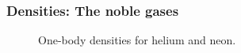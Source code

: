 \begin{frame}
\frametitle{Densities: The noble gases}
 \begin{figure}
 \begin{center}
  \caption{One-body densities for helium and neon. }
  \label{fig:OBD_noble_Atoms_2D_combo}
 \end{center}
\end{figure}
\end{frame}




